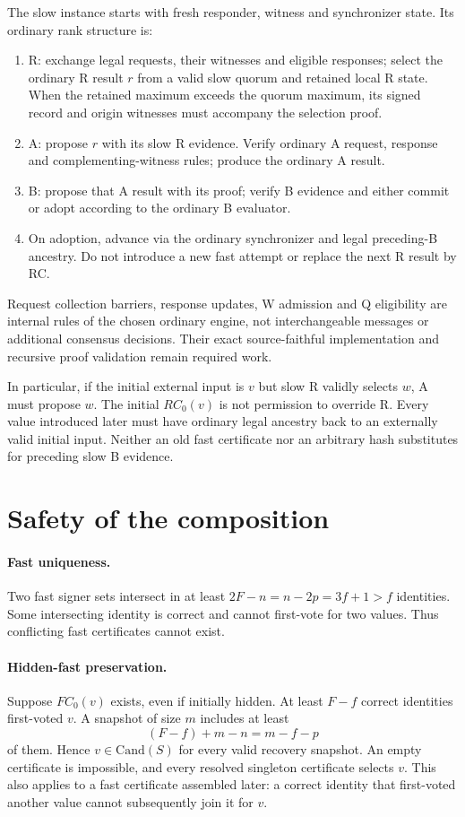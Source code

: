 \documentclass[11pt]{article}
\begin{document}
The slow instance starts with fresh responder, witness and synchronizer state.
Its ordinary rank structure is:
\begin{enumerate}
\item R: exchange legal requests, their witnesses and eligible responses;
select the ordinary R result $r$ from a valid slow quorum and retained local R state.
When the retained maximum exceeds the quorum maximum, its signed record and
origin witnesses must accompany the selection proof.
\item A: propose $r$ with its slow R evidence. Verify ordinary A request,
response and complementing-witness rules; produce the ordinary A result.
\item B: propose that A result with its proof; verify B evidence and either
commit or adopt according to the ordinary B evaluator.
\item On adoption, advance via the ordinary synchronizer and legal preceding-B
ancestry. Do not introduce a new fast attempt or replace the next R result by RC.
\end{enumerate}
Request collection barriers, response updates, W admission and Q eligibility
are internal rules of the chosen ordinary engine, not interchangeable messages
or additional consensus decisions. Their exact source-faithful implementation
and recursive proof validation remain required work.

In particular, if the initial external input is $v$ but slow R validly selects
$w$, A must propose $w$. The initial $RC_0(v)$ is not permission to override R.
Every value introduced later must have ordinary legal ancestry back to an
externally valid initial input. Neither an old fast certificate nor an arbitrary
hash substitutes for preceding slow B evidence.

\section{Safety of the composition}
\paragraph{Fast uniqueness.}
Two fast signer sets intersect in at least $2F-n=n-2p=3f+1>f$ identities.
Some intersecting identity is correct and cannot first-vote for two values.
Thus conflicting fast certificates cannot exist.

\paragraph{Hidden-fast preservation.}
Suppose $FC_0(v)$ exists, even if initially hidden. At least $F-f$ correct
identities first-voted $v$. A snapshot of size $m$ includes at least
\[
 (F-f)+m-n=m-f-p
\]
of them. Hence $v\in\mathrm{Cand}(S)$ for every valid recovery snapshot.
An empty certificate is impossible, and every resolved singleton certificate
selects $v$. This also applies to a fast certificate assembled later: a correct
identity that first-voted another value cannot subsequently join it for $v$.
\end{document}
